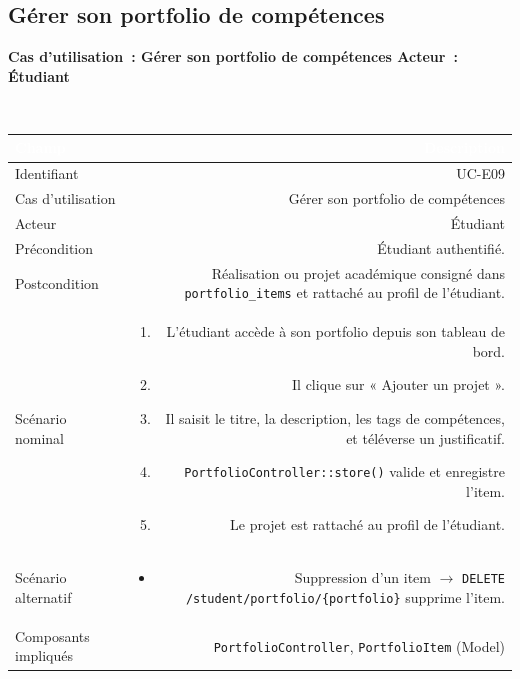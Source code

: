 \documentclass[a4paper,12pt]{article}
\newcommand{\ucheader}[2]{%
  \noindent\colorbox{capblue}{\parbox{\dimexpr\linewidth-2\fboxsep}{%
    \color{white}\bfseries\large Cas d'utilisation~: #1 \hfill \normalsize Acteur~: #2
  }}\\[2pt]
}
\begin{document}
\vspace{1em}

\subsection{Gérer son portfolio de compétences}
\ucheader{Gérer son portfolio de compétences}{Étudiant}

\noindent
\begin{tabular}{|L|R|}
\hline
{}\textcolor{white}{\textbf{Champ}} & \textcolor{white}{\textbf{Description}} \\
\hline
{}Identifiant & UC-E09 \\
\hline
Cas d'utilisation & Gérer son portfolio de compétences \\
\hline
{}Acteur & Étudiant \\
\hline
Précondition & Étudiant authentifié. \\
\hline
{}Postcondition & Réalisation ou projet académique consigné dans \texttt{portfolio\_items} et rattaché au profil de l'étudiant. \\
\hline
Scénario nominal &
\begin{enumerate}
  \item L'étudiant accède à son portfolio depuis son tableau de bord.
  \item Il clique sur « Ajouter un projet ».
  \item Il saisit le titre, la description, les tags de compétences, et téléverse un justificatif.
  \item \texttt{PortfolioController::store()} valide et enregistre l'item.
  \item Le projet est rattaché au profil de l'étudiant.
\end{enumerate} \\
\hline
{}Scénario alternatif &
\begin{itemize}
  \item Suppression d'un item $\rightarrow$ \texttt{DELETE /student/portfolio/\{portfolio\}} supprime l'item.
\end{itemize} \\
\hline
Composants impliqués & \texttt{PortfolioController}, \texttt{PortfolioItem} (Model) \\
\hline
\end{tabular}
\end{document}

